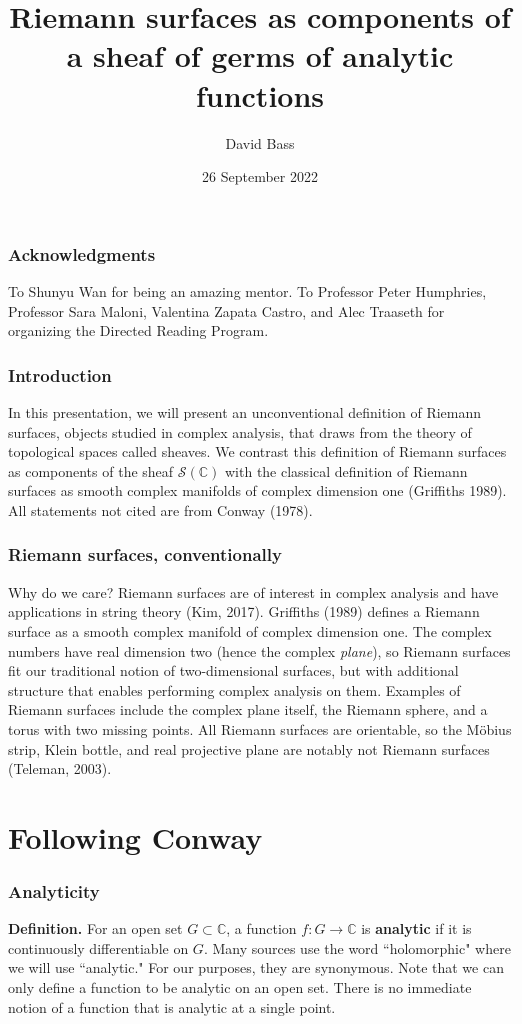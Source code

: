 \documentclass{beamer}
\title{Riemann surfaces as components of a sheaf of germs of analytic functions}
\author{David Bass}
\date{26 September 2022}
\newcommand{\ra}{\rightarrow}
\newcommand{\cs}{\mathbb{C}}
\begin{document}
	
	\begin{frame}
		\titlepage
	\end{frame}
	
	\begin{frame}
		\frametitle{Acknowledgments}
		To Shunyu Wan for being an amazing mentor.
		\vskip0.05in
		To Professor Peter Humphries, Professor Sara Maloni, Valentina Zapata Castro, and Alec Traaseth for organizing the Directed Reading Program.
	\end{frame}
	
	\begin{frame}
		\frametitle{Introduction}
		In this presentation, we will present an unconventional definition of Riemann surfaces, objects studied in complex analysis, that draws from the theory of topological spaces called sheaves. We contrast this definition of Riemann surfaces as components of the sheaf $\mathscr S(\cs)$ with the classical definition of Riemann surfaces as smooth complex manifolds of complex dimension one (Griffiths 1989).
		\vskip0.2in
		All statements not cited are from Conway (1978).
	\end{frame}

	\begin{frame}
		\frametitle{Riemann surfaces, conventionally}
		Why do we care? Riemann surfaces are of interest in complex analysis and have applications in string theory (Kim, 2017).
		\vskip0.2in
		Griffiths (1989) defines a Riemann surface as a smooth complex manifold of complex dimension one. The complex numbers have real dimension two (hence the complex \textit{plane}), so Riemann surfaces fit our traditional notion of two-dimensional surfaces, but with additional structure that enables performing complex analysis on them.
		\vskip0.2in
		Examples of Riemann surfaces include the complex plane itself, the Riemann sphere, and a torus with two missing points. All Riemann surfaces are orientable, so the M{\"o}bius strip, Klein bottle, and real projective plane are notably not Riemann surfaces (Teleman, 2003).
	\end{frame}

	\section{Following Conway}
	\begin{frame}
		\frametitle{Analyticity}
		\textbf{Definition.} For an open set $G \subset \cs$, a function $f : G \ra \cs$ is \textbf{analytic} if it is continuously differentiable on $G$.
		\vskip0.2in
		Many sources use the word ``holomorphic" where we will use ``analytic." For our purposes, they are synonymous.
		\vskip0.2in
		Note that we can only define a function to be analytic on an open set. There is no immediate notion of a function that is analytic at a single point.
	\end{frame}
\end{document}

